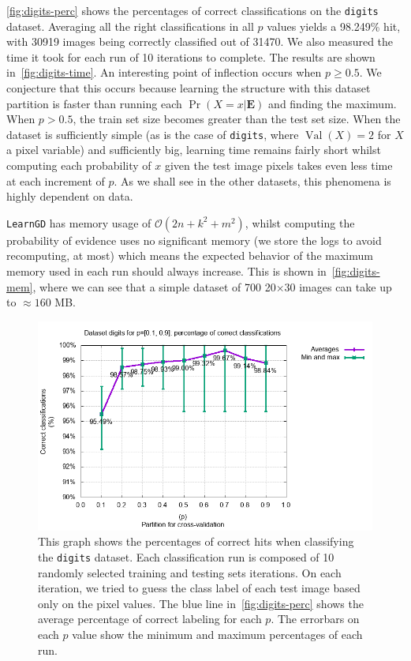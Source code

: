 \documentclass{amsart}
\DeclareMathOperator*{\Val}{\text{Val}}
\theoremstyle{plain}
\numberwithin{equation}{section}
\newcommand{\set}[1]{\mathbf{#1}}
\newcommand{\bigo}{\mathcal{O}}
\newcommand{\code}[1]{\lstinline[mathescape=true]{#1}}
\begin{document}
\autoref{fig:digits-perc} shows the percentages of correct classifications on the \code{digits}
dataset. Averaging all the right classifications in all $p$ values yields a 98.249\% hit, with
30919 images being correctly classified out of 31470. We also measured the time it took for each
run of 10 iterations to complete. The results are shown in~\autoref{fig:digits-time}. An
interesting point of inflection occurs when $p\geq 0.5$. We conjecture that this occurs because
learning the structure with this dataset partition is faster than running each $\Pr(X=x | \set{E})$
and finding the maximum. When $p > 0.5$, the train set size becomes greater than the test set size.
When the dataset is sufficiently simple (as is the case of \code{digits}, where $\Val(X)=2$ for $X$
a pixel variable) and sufficiently big, learning time remains fairly short whilst computing each
probability of $x$ given the test image pixels takes even less time at each increment of $p$. As we
shall see in the other datasets, this phenomena is highly dependent on data.

\code{LearnGD} has memory usage of $\bigo(2n+k^2+m^2)$, whilst computing the probability of
evidence uses no significant memory (we store the logs to avoid recomputing, at most) which means
the expected behavior of the maximum memory used in each run should always increase. This is shown
in~\autoref{fig:digits-mem}, where we can see that a simple dataset of 700 20$\times$30 images can
take up to $\approx 160$ MB\@.

\begin{figure}[p]
  \centering\includegraphics[scale=0.6]{imgs/digits_percs.png}
  \captionsetup{singlelinecheck=false,justification=justified,margin=0cm}
  \caption{This graph shows the percentages of correct hits when classifying the \code{digits}
  dataset. Each classification run is composed of 10 randomly selected training and testing sets
  iterations. On each iteration, we tried to guess the class label of each test image based only on
  the pixel values. The blue line in~\autoref{fig:digits-perc} shows the average percentage of
  correct labeling for each $p$. The errorbars on each $p$ value show the minimum and maximum
  percentages of each run.}\label{fig:digits-perc}
\end{figure}
\end{document}
